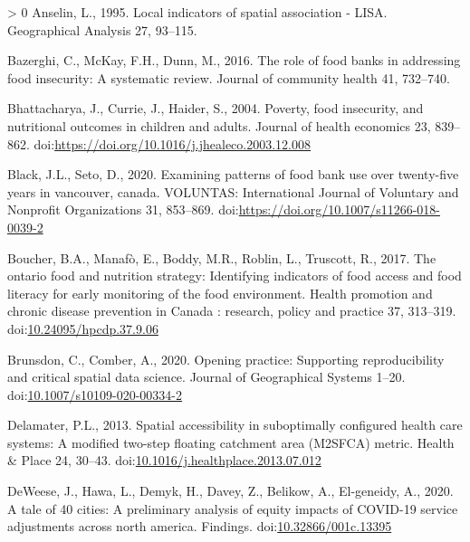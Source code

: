 \documentclass[]{elsarticle} %
\newlength{\cslhangindent}
\newenvironment{CSLReferences}[3] %
 {%
  \setlength{\parindent}{0pt}
  \ifodd #1 \everypar{\setlength{\hangindent}{\cslhangindent}}\ignorespaces\fi
  \ifnum #2 > 0
  \setlength{\parskip}{#2\baselineskip}
  \fi
 }%
 {}
\begin{document}
\hypertarget{refs}{}
\begin{CSLReferences}{1}{0}
\leavevmode\hypertarget{ref-anselin1995local}{}%
Anselin, L., 1995. Local indicators of spatial association - LISA.
Geographical Analysis 27, 93--115.

\leavevmode\hypertarget{ref-bazerghi2016role}{}%
Bazerghi, C., McKay, F.H., Dunn, M., 2016. The role of food banks in
addressing food insecurity: A systematic review. Journal of community
health 41, 732--740.

\leavevmode\hypertarget{ref-bhattacharya2004poverty}{}%
Bhattacharya, J., Currie, J., Haider, S., 2004. Poverty, food
insecurity, and nutritional outcomes in children and adults. Journal of
health economics 23, 839--862.
doi:\url{https://doi.org/10.1016/j.jhealeco.2003.12.008}

\leavevmode\hypertarget{ref-black2020examining}{}%
Black, J.L., Seto, D., 2020. Examining patterns of food bank use over
twenty-five years in vancouver, canada. VOLUNTAS: International Journal
of Voluntary and Nonprofit Organizations 31, 853--869.
doi:\url{https://doi.org/10.1007/s11266-018-0039-2}

\leavevmode\hypertarget{ref-boucher2017ontario}{}%
Boucher, B.A., Manafò, E., Boddy, M.R., Roblin, L., Truscott, R., 2017.
The ontario food and nutrition strategy: Identifying indicators of food
access and food literacy for early monitoring of the food environment.
Health promotion and chronic disease prevention in Canada : research,
policy and practice 37, 313--319.
doi:\href{https://doi.org/10.24095/hpcdp.37.9.06}{10.24095/hpcdp.37.9.06}

\leavevmode\hypertarget{ref-brunsdon2020opening}{}%
Brunsdon, C., Comber, A., 2020. Opening practice: Supporting
reproducibility and critical spatial data science. Journal of
Geographical Systems 1--20.
doi:\href{https://doi.org/10.1007/s10109-020-00334-2}{10.1007/s10109-020-00334-2}

\leavevmode\hypertarget{ref-delamater2013spatial}{}%
Delamater, P.L., 2013. Spatial accessibility in suboptimally configured
health care systems: A modified two-step floating catchment area
(M2SFCA) metric. Health \& Place 24, 30--43.
doi:\href{https://doi.org/10.1016/j.healthplace.2013.07.012}{10.1016/j.healthplace.2013.07.012}

\leavevmode\hypertarget{ref-deweese2020tale}{}%
DeWeese, J., Hawa, L., Demyk, H., Davey, Z., Belikow, A., El-geneidy,
A., 2020. A tale of 40 cities: A preliminary analysis of equity impacts
of COVID-19 service adjustments across north america. Findings.
doi:\href{https://doi.org/10.32866/001c.13395}{10.32866/001c.13395}


\end{CSLReferences}
\end{document}
